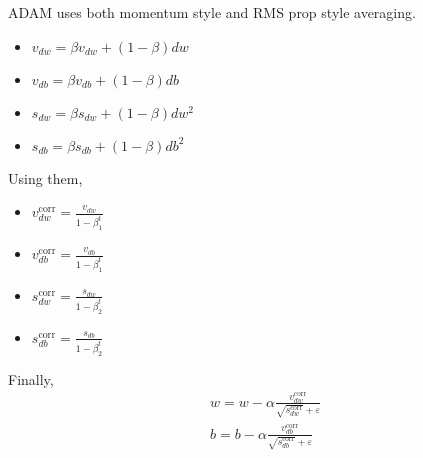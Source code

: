 ADAM uses both momentum style and RMS prop style averaging. 
\begin{itemize}
	\item $v_{dw} = \beta v_{dw} + (1-\beta)dw$
	\item $v_{db} = \beta v_{db} + (1-\beta)db$
	\item $s_{dw} = \beta s_{dw} + (1-\beta)dw^2 $
	\item $s_{db} = \beta s_{db} + (1-\beta)db^2 $
\end{itemize}

Using them,
\begin{itemize}
	\item $ v^{\textrm{corr}}_{dw} = \frac{v_{dw}}{1-\beta_1^t}$
	\item $ v^{\textrm{corr}}_{db} = \frac{v_{db}}{1-\beta_1^t}$
	\item $ s^{\textrm{corr}}_{dw} = \frac{s_{dw}}{1-\beta_2^t}$
	\item $ s^{\textrm{corr}}_{db} = \frac{s_{db}}{1-\beta_2^t}$
\end{itemize}

Finally, 
\begin{align*}
	& w = w-\alpha  \frac{v^{\textrm{corr}}_{dw}}{\sqrt{s^{\textrm{corr}}_{dw}}+\varepsilon}\\
	& b = b-\alpha  \frac{v^{\textrm{corr}}_{db}}{\sqrt{s^{\textrm{corr}}_{db}}+\varepsilon}\\
\end{align*}




